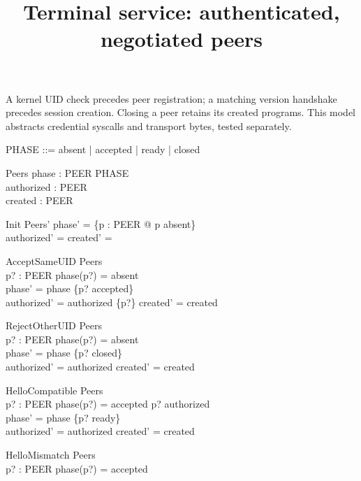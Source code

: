 \documentclass[a4paper,10pt]{article}
\begin{document}
\title{Terminal service: authenticated, negotiated peers}
\maketitle

A kernel UID check precedes peer registration; a matching version handshake
precedes session creation. Closing a peer retains its created programs.
This model abstracts credential syscalls and transport bytes, tested separately.

\begin{zed}
[PEER]
\end{zed}
\begin{zed}
PHASE ::= absent | accepted | ready | closed
\end{zed}
\begin{schema}{Peers}
phase : PEER \fun PHASE \\
authorized : \power PEER \\
created : \power PEER
\end{schema}
\begin{schema}{Init}
Peers'
\where
phase' = \{p : PEER @ p \mapsto absent\} \\
authorized' = \emptyset \land created' = \emptyset
\end{schema}
\begin{schema}{AcceptSameUID}
\Delta Peers \\
p? : PEER
\where
phase(p?) = absent \\
phase' = phase \oplus \{p? \mapsto accepted\} \\
authorized' = authorized \cup \{p?\} \land created' = created
\end{schema}
\begin{schema}{RejectOtherUID}
\Delta Peers \\
p? : PEER
\where
phase(p?) = absent \\
phase' = phase \oplus \{p? \mapsto closed\} \\
authorized' = authorized \land created' = created
\end{schema}
\begin{schema}{HelloCompatible}
\Delta Peers \\
p? : PEER
\where
phase(p?) = accepted \land p? \in authorized \\
phase' = phase \oplus \{p? \mapsto ready\} \\
authorized' = authorized \land created' = created
\end{schema}
\begin{schema}{HelloMismatch}
\Xi Peers \\
p? : PEER
\where
phase(p?) = accepted
\end{schema}
\end{document}
